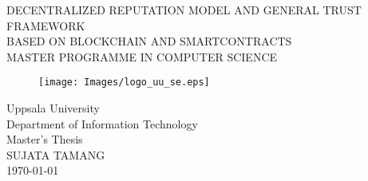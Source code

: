 
\thispagestyle{empty}

\vspace*{+5em}
\begin{center}
DECENTRALIZED REPUTATION MODEL AND GENERAL TRUST FRAMEWORK\\
BASED ON BLOCKCHAIN AND SMARTCONTRACTS \\
\vspace*{+8em}
\vspace{+2em}
MASTER PROGRAMME IN COMPUTER SCIENCE\\

\vspace*{+3em}
\begin{figure}[H]
\centering
\texttt{[image: Images/logo\_uu\_se.eps]}
\end{figure}

\vspace*{+3em}
Uppsala University\\
Department of Information Technology\\
\vspace*{+2em}
Master's Thesis \\
SUJATA TAMANG\\

\vspace*{+12em}
\today
\end{center}

